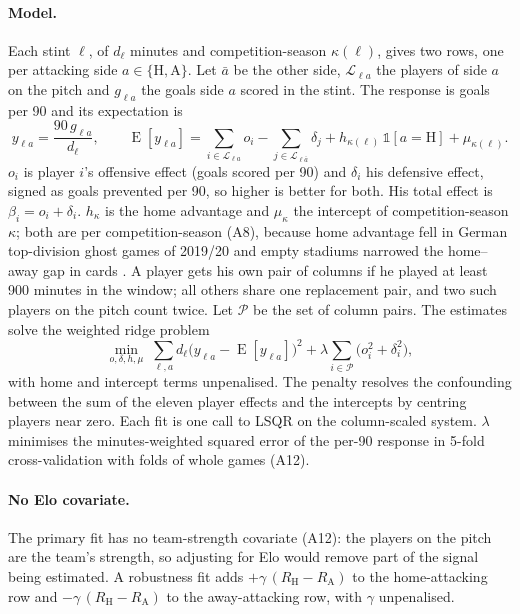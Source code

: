 \documentclass[11pt,a4paper]{article}
\DeclareMathOperator{\E}{E}
\begin{document}
\paragraph{Model.}
Each stint $\ell$, of $d_\ell$ minutes and competition-season $\kappa(\ell)$,
gives two rows, one per attacking side $a \in \{\mathrm H, \mathrm A\}$. Let
$\bar a$ be the other side, $\mathcal L_{\ell a}$ the players of side $a$ on the
pitch and $g_{\ell a}$ the goals side $a$ scored in the stint. The response is
goals per 90 and its expectation is
\begin{equation}
  y_{\ell a} = \frac{90\, g_{\ell a}}{d_\ell},
  \qquad
  \E[y_{\ell a}] = \sum_{i \in \mathcal L_{\ell a}} o_i
    - \sum_{j \in \mathcal L_{\ell \bar a}} \delta_j
    + h_{\kappa(\ell)}\, \mathbb 1[a = \mathrm H] + \mu_{\kappa(\ell)} .
  \label{eq:rapm-model}
\end{equation}
$o_i$ is player $i$'s offensive effect (goals scored per 90) and $\delta_i$ his
defensive effect, signed as goals prevented per 90, so higher is better for
both. His total effect is $\beta_i = o_i + \delta_i$. $h_\kappa$ is the home
advantage and $\mu_\kappa$ the intercept of competition-season $\kappa$; both
are per competition-season (A8), because home advantage fell in German
top-division ghost games of 2019/20 \citep{fischer2021ghost} and empty stadiums
narrowed the home--away gap in cards \citep{bryson2021crowd}. A
player gets his own pair of columns if he played at least 900 minutes in the
window; all others share one replacement pair, and two such players on the
pitch count twice. Let $\mathcal P$ be the set of column pairs. The estimates
solve the weighted ridge problem \citep{hoerl1970ridge}
\begin{equation}
  \min_{o, \delta, h, \mu}\;
  \sum_{\ell, a} d_\ell \big(y_{\ell a} - \E[y_{\ell a}]\big)^2
  + \lambda \sum_{i \in \mathcal P} \big(o_i^2 + \delta_i^2\big),
  \label{eq:rapm-obj}
\end{equation}
with home and intercept terms unpenalised. The penalty resolves the
confounding between the sum of the eleven player effects and the intercepts by
centring players near zero. Each fit is one call to LSQR
\citep{paige1982lsqr} on the column-scaled system. $\lambda$ minimises the
minutes-weighted squared error of the per-90 response in 5-fold
cross-validation with folds of whole games (A12).

\paragraph{No Elo covariate.}
The primary fit has no team-strength covariate (A12): the players on the pitch
are the team's strength, so adjusting for Elo would remove part of the signal
being estimated. A robustness fit adds $+\gamma\,(R_{\mathrm H} - R_{\mathrm A})$
to the home-attacking row and $-\gamma\,(R_{\mathrm H} - R_{\mathrm A})$ to the
away-attacking row, with $\gamma$ unpenalised.
\end{document}
